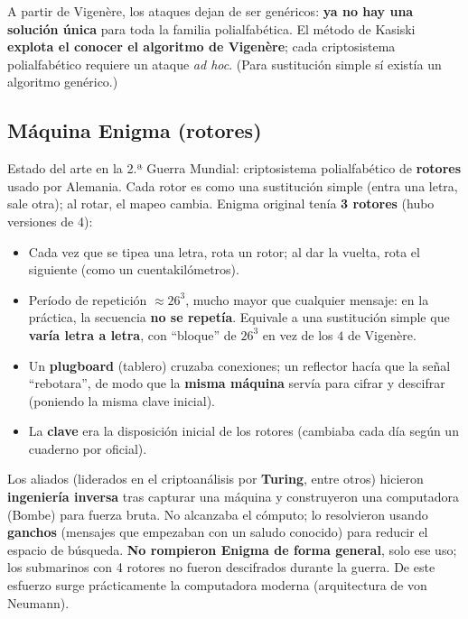 \documentclass[../main.tex]{subfiles}
\begin{document}
\begin{destacado}
A partir de Vigenère, los ataques dejan de ser genéricos: \textbf{ya no hay una
solución única} para toda la familia polialfabética. El método de Kasiski
\textbf{explota el conocer el algoritmo de Vigenère}; cada criptosistema
polialfabético requiere un ataque \emph{ad hoc}. (Para sustitución simple sí
existía un algoritmo genérico.)
\end{destacado}

\subsection{Máquina Enigma (rotores)}

Estado del arte en la 2.ª Guerra Mundial: criptosistema polialfabético de
\textbf{rotores} usado por Alemania. Cada rotor es como una sustitución simple
(entra una letra, sale otra); al rotar, el mapeo cambia. Enigma original tenía
\textbf{3 rotores} (hubo versiones de 4):
\begin{itemize}[nosep]
  \item Cada vez que se tipea una letra, rota un rotor; al dar la vuelta, rota el
        siguiente (como un cuentakilómetros).
  \item Período de repetición $\approx 26^3$, mucho mayor que cualquier mensaje:
        en la práctica, la secuencia \textbf{no se repetía}. Equivale a una
        sustitución simple que \textbf{varía letra a letra}, con ``bloque'' de
        $26^3$ en vez de los $4$ de Vigenère.
  \item Un \textbf{plugboard} (tablero) cruzaba conexiones; un reflector hacía
        que la señal ``rebotara'', de modo que la \textbf{misma máquina} servía
        para cifrar y descifrar (poniendo la misma clave inicial).
  \item La \textbf{clave} era la disposición inicial de los rotores (cambiaba
        cada día según un cuaderno por oficial).
\end{itemize}
Los aliados (liderados en el criptoanálisis por \textbf{Turing}, entre otros)
hicieron \textbf{ingeniería inversa} tras capturar una máquina y construyeron
una computadora (Bombe) para fuerza bruta. No alcanzaba el cómputo; lo
resolvieron usando \textbf{ganchos} (mensajes que empezaban con un saludo
conocido) para reducir el espacio de búsqueda. \textbf{No rompieron Enigma de
forma general}, solo ese uso; los submarinos con 4 rotores no fueron descifrados
durante la guerra. De este esfuerzo surge prácticamente la computadora moderna
(arquitectura de von Neumann).
\end{document}
